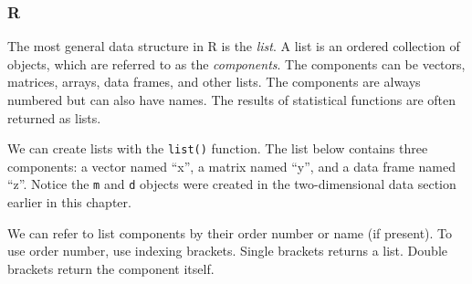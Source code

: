 \documentclass[
]{book}
\newenvironment{Shaded}{\begin{snugshade}}{\end{snugshade}}
\newcommand{\AttributeTok}[1]{\textcolor[rgb]{0.77,0.63,0.00}{#1}}
\newcommand{\DecValTok}[1]{\textcolor[rgb]{0.00,0.00,0.81}{#1}}
\newcommand{\FunctionTok}[1]{\textcolor[rgb]{0.00,0.00,0.00}{#1}}
\newcommand{\NormalTok}[1]{#1}
\newcommand{\OtherTok}[1]{\textcolor[rgb]{0.56,0.35,0.01}{#1}}
\newcommand{\SpecialCharTok}[1]{\textcolor[rgb]{0.00,0.00,0.00}{#1}}
\begin{document}
\hypertarget{r-11}{%
\subsubsection*{R}\label{r-11}}

The most general data structure in R is the \emph{list}. A list is an ordered collection of objects, which are referred to as the \emph{components}. The components can be vectors, matrices, arrays, data frames, and other lists. The components are always numbered but can also have names. The results of statistical functions are often returned as lists.

We can create lists with the \texttt{list()} function. The list below contains three components: a vector named ``x'', a matrix named ``y'', and a data frame named ``z''. Notice the \texttt{m} and \texttt{d} objects were created in the two-dimensional data section earlier in this chapter.

\begin{Shaded}
\end{Shaded}

We can refer to list components by their order number or name (if present). To use order number, use indexing brackets. Single brackets returns a list. Double brackets return the component itself.
\end{document}
